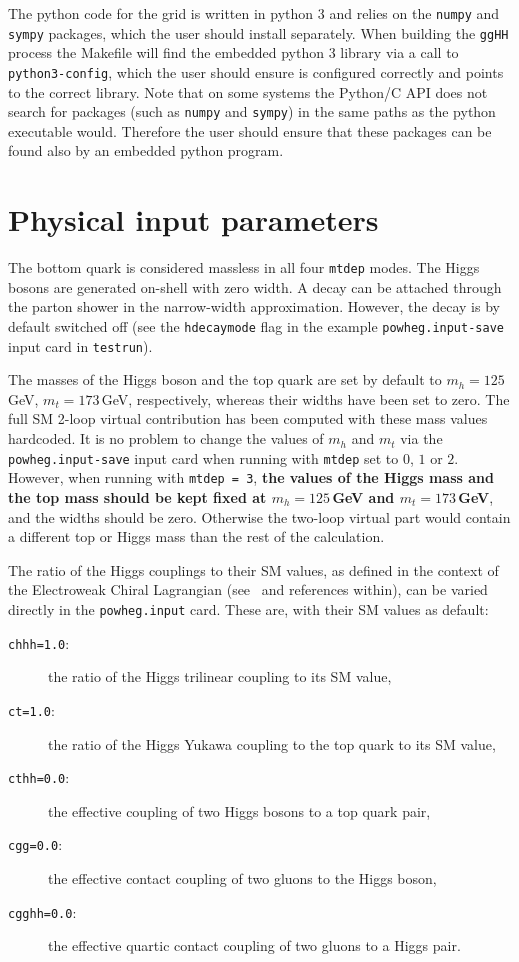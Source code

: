 \documentclass[paper]{JHEP3}
\begin{document}
The python code for the grid is written in python 3 and relies on the {\tt numpy} and {\tt sympy} packages, which 
the user should install separately. When building the {\tt ggHH} process the Makefile will find the embedded python 3 library
via a call to {\tt python3-config}, which the user should ensure is configured correctly and points to the correct library.
Note that on some systems the Python/C API does not search for packages (such as {\tt numpy} and {\tt sympy}) in the same 
paths as the python executable would. Therefore the user should ensure that these packages can be found also by an embedded python program.

\section{Physical input parameters}

The bottom quark is considered massless in all four {\tt mtdep} modes. The Higgs
bosons are generated on-shell with zero width. A decay can be attached
through the parton shower in the narrow-width approximation. However,
the decay is by default switched off (see the {\tt hdecaymode} flag in the
example {\tt powheg.input-save} input card in {\tt testrun}).

The masses of the Higgs boson and the top quark are set by default to
$m_h=125$\,GeV, $m_t=173$\,GeV, respectively, whereas their widths
have been set to zero. The full SM 2-loop virtual contribution has
been computed with these mass values hardcoded. 
It is no problem to change the values of $m_h$
and $m_t$ via the {\tt powheg.input-save} input card when running with
{\tt mtdep} set to $0$, $1$ or $2$.
However, when running with {\tt mtdep = 3}, 
 {\bf the values of the Higgs mass and
the top mass should be kept fixed at $m_h=125$\,GeV and $m_t=173$\,GeV}, and the widths should be zero.
Otherwise the two-loop virtual part would contain a different top or Higgs mass than the rest of the calculation.

The ratio of the Higgs couplings to their SM values, as defined in the context of the Electroweak Chiral Lagrangian (see~\cite{Buchalla:2018yce} and references within), can be varied directly in the {\tt powheg.input} card. These are, with their SM values as default:

\begin{description}
\item[{\tt chhh=1.0}:] { the ratio of the Higgs trilinear coupling to its SM value,}
\item[{\tt ct=1.0}:] { the ratio of the Higgs Yukawa coupling to the top quark to its SM value,}
\item[{\tt cthh=0.0}:] { the effective coupling of two Higgs bosons to a top quark pair,}
\item[{\tt cgg=0.0}:] { the effective contact coupling of two gluons to the Higgs boson,}
\item[{\tt cgghh=0.0}:] { the effective quartic contact coupling of two gluons to a Higgs pair.}
\end{description}
\end{document}
